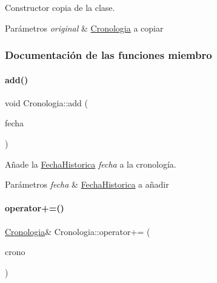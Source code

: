 Constructor copia de la clase. 


\begin{DoxyParams}{Parámetros}
{\em original} & {\ttfamily \hyperlink{classCronologia}{Cronologia}} a copiar \\
\hline
\end{DoxyParams}


\subsubsection{Documentación de las funciones miembro}
\mbox{\label{classCronologia_a6bb1e610054cf194005014767f7056d5}} 
\paragraph{\texorpdfstring{add()}{add()}}
{\footnotesize\ttfamily void Cronologia\+::add (\begin{DoxyParamCaption}\item[{const \hyperlink{classFechaHistorica}{Fecha\+Historica} \&}]{fecha }\end{DoxyParamCaption})}



Añade la {\ttfamily \hyperlink{classFechaHistorica}{Fecha\+Historica}} {\itshape fecha} a la cronología. 


\begin{DoxyParams}{Parámetros}
{\em fecha} & {\ttfamily \hyperlink{classFechaHistorica}{Fecha\+Historica}} a añadir \\
\hline
\end{DoxyParams}
\mbox{\label{classCronologia_a4423d0f1668c8af15811fc58a2c63335}} 
\paragraph{\texorpdfstring{operator+=()}{operator+=()}}
{\footnotesize\ttfamily \hyperlink{classCronologia}{Cronologia}\& Cronologia\+::operator+= (\begin{DoxyParamCaption}\item[{const \hyperlink{classCronologia}{Cronologia} \&}]{crono }\end{DoxyParamCaption})}



